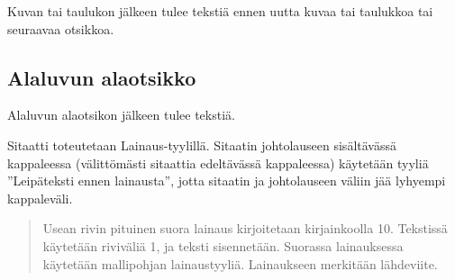 Kuvan tai taulukon jälkeen tulee tekstiä ennen uutta kuvaa tai taulukkoa tai seuraavaa otsikkoa.

\subsection{Alaluvun alaotsikko}

Alaluvun alaotsikon jälkeen tulee tekstiä.

Sitaatti toteutetaan Lainaus-tyylillä. Sitaatin johtolauseen sisältävässä kappaleessa (välittömästi sitaattia edeltävässä kappaleessa) käytetään tyyliä ”Leipäteksti ennen lainausta”, jotta sitaatin ja johtolauseen väliin jää lyhyempi kappaleväli.

\begin{quote}
Usean rivin pituinen suora lainaus kirjoitetaan kirjainkoolla 10. Tekstissä käytetään riviväliä 1, ja teksti sisennetään. Suorassa lainauksessa käytetään mallipohjan lainaustyyliä. Lainaukseen merkitään lähdeviite.
\end{quote}